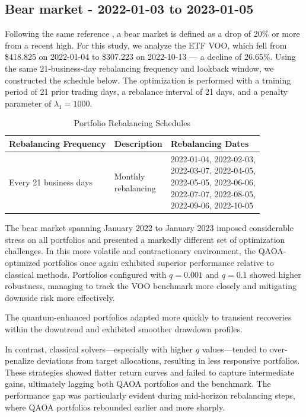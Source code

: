 \documentclass[12pt]{article}
\begin{document}
\subsection{Bear market - 2022-01-03 to 2023-01-05}

Following the same reference \cite{fidelity_bear_bull}, a bear market is defined as a drop of 20\% or more from a recent high. For this study, we analyze the ETF VOO, which fell from \$418.825 on 2022-01-04 to \$307.223 on 2022-10-13 — a decline of 26.65\%. Using the same 21-business-day rebalancing frequency and lookback window, we constructed the schedule below. The optimization is performed with a training period of 21 prior trading days, a rebalance interval of 21 days, and a penalty parameter of \(\lambda_1 = 1000\).

\begin{table}[H]
\centering
\caption{Portfolio Rebalancing Schedules}
\begin{tabular}{|l|p{4cm}|p{5cm}|}
\hline
\textbf{Rebalancing Frequency} & \textbf{Description} & \textbf{Rebalancing Dates} \\
\hline
Every 21 business days & \makecell[l]{Monthly\\rebalancing} & 
\makecell[l]{
2022-01-04, 2022-02-03,\\
2022-03-07, 2022-04-05,\\
2022-05-05, 2022-06-06,\\
2022-07-07, 2022-08-05,\\
2022-09-06, 2022-10-05
} \\
\hline
\end{tabular}
\label{tab:bear_VOO}
\end{table}

The bear market spanning January 2022 to January 2023 imposed considerable stress on all portfolios and presented a markedly different set of optimization challenges. In this more volatile and contractionary environment, the QAOA-optimized portfolios once again exhibited superior performance relative to classical methods. Portfolios configured with \( q = 0.001 \) and \( q = 0.1 \) showed higher robustness, managing to track the VOO benchmark more closely and mitigating downside risk more effectively.

The quantum-enhanced portfolios adapted more quickly to transient recoveries within the downtrend and exhibited smoother drawdown profiles.

In contrast, classical solvers—especially with higher \( q \) values—tended to over-penalize deviations from target allocations, resulting in less responsive portfolios. These strategies showed flatter return curves and failed to capture intermediate gains, ultimately lagging both QAOA portfolios and the benchmark. The performance gap was particularly evident during mid-horizon rebalancing steps, where QAOA portfolios rebounded earlier and more sharply.
\end{document}
